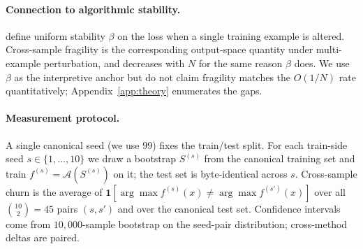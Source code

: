 \paragraph{Connection to algorithmic stability.}
\citet{TODO_bousquet2002} define uniform stability $\beta$ on the
loss when a single training example is altered.  Cross-sample
fragility is the corresponding output-space quantity under
multi-example perturbation, and decreases with $N$ for the same
reason $\beta$ does.  We use $\beta$ as the interpretive anchor but
do not claim fragility matches the $O(1/N)$ rate quantitatively;
Appendix~\ref{app:theory} enumerates the gaps.

\paragraph{Measurement protocol.}
A single canonical seed (we use $99$) fixes the train/test split.
For each train-side seed $s \in \{1, \dots, 10\}$ we draw a bootstrap
$S^{(s)}$ from the canonical training set and train
$f^{(s)} = \mathcal{A}(S^{(s)})$ on it; the test set is byte-identical
across $s$.  Cross-sample churn is the average of
$\mathbf{1}[\arg\max f^{(s)}(x) \neq \arg\max f^{(s')}(x)]$ over all
$\binom{10}{2}=45$ pairs $(s, s')$ and over the canonical test set.
Confidence intervals come from $10{,}000$-sample bootstrap on the
seed-pair distribution; cross-method deltas are paired.
